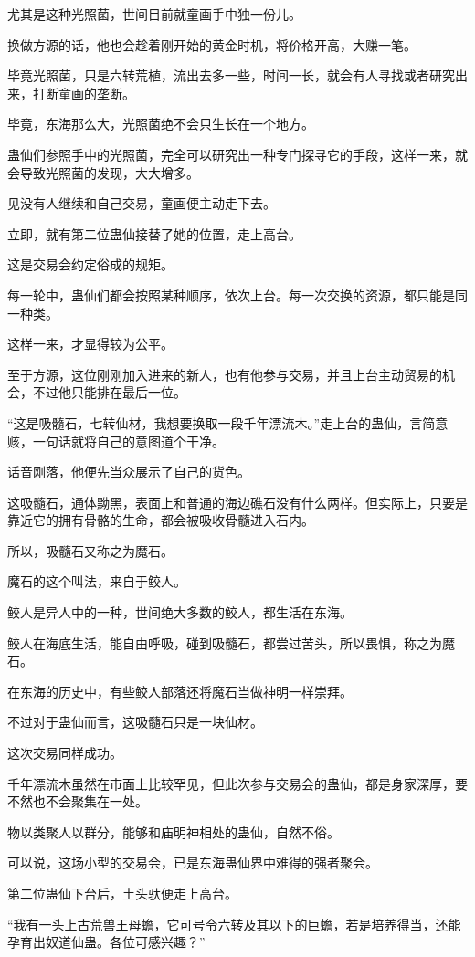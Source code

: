 \begin{this_body}
尤其是这种光照菌，世间目前就童画手中独一份儿。

换做方源的话，他也会趁着刚开始的黄金时机，将价格开高，大赚一笔。

毕竟光照菌，只是六转荒植，流出去多一些，时间一长，就会有人寻找或者研究出来，打断童画的垄断。

毕竟，东海那么大，光照菌绝不会只生长在一个地方。

蛊仙们参照手中的光照菌，完全可以研究出一种专门探寻它的手段，这样一来，就会导致光照菌的发现，大大增多。

见没有人继续和自己交易，童画便主动走下去。

立即，就有第二位蛊仙接替了她的位置，走上高台。

这是交易会约定俗成的规矩。

每一轮中，蛊仙们都会按照某种顺序，依次上台。每一次交换的资源，都只能是同一种类。

这样一来，才显得较为公平。

至于方源，这位刚刚加入进来的新人，也有他参与交易，并且上台主动贸易的机会，不过他只能排在最后一位。

“这是吸髓石，七转仙材，我想要换取一段千年漂流木。”走上台的蛊仙，言简意赅，一句话就将自己的意图道个干净。

话音刚落，他便先当众展示了自己的货色。

这吸髓石，通体黝黑，表面上和普通的海边礁石没有什么两样。但实际上，只要是靠近它的拥有骨骼的生命，都会被吸收骨髓进入石内。

所以，吸髓石又称之为魔石。

魔石的这个叫法，来自于鲛人。

鲛人是异人中的一种，世间绝大多数的鲛人，都生活在东海。

鲛人在海底生活，能自由呼吸，碰到吸髓石，都尝过苦头，所以畏惧，称之为魔石。

在东海的历史中，有些鲛人部落还将魔石当做神明一样崇拜。

不过对于蛊仙而言，这吸髓石只是一块仙材。

这次交易同样成功。

千年漂流木虽然在市面上比较罕见，但此次参与交易会的蛊仙，都是身家深厚，要不然也不会聚集在一处。

物以类聚人以群分，能够和庙明神相处的蛊仙，自然不俗。

可以说，这场小型的交易会，已是东海蛊仙界中难得的强者聚会。

第二位蛊仙下台后，土头驮便走上高台。

“我有一头上古荒兽王母蟾，它可号令六转及其以下的巨蟾，若是培养得当，还能孕育出奴道仙蛊。各位可感兴趣？”


\end{this_body}
